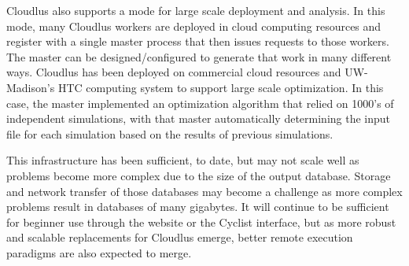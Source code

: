 Cloudlus also supports a mode for large scale deployment and analysis.  In
this mode, many Cloudlus workers are deployed in cloud computing resources and
register with a single master process that then issues requests to those
workers. The master can be designed/configured to generate that work in many
different ways. Cloudlus has been deployed on commercial cloud resources and
UW-Madison's \gls{HTC} computing system to support large scale
optimization.  In this case, the master implemented an
optimization algorithm that relied on 1000's of independent \Cyclus
simulations, with that master automatically determining the input file for
each simulation based on the results of previous simulations.

This infrastructure has been sufficient, to date, but may not scale well as
problems become more complex due to the size of the output database.  Storage
and network transfer of those databases may become a challenge as more complex
problems result in databases of many gigabytes.  It will continue to be
sufficient for beginner use through the website or the Cyclist interface, but
as more robust and scalable replacements for Cloudlus emerge, better remote
execution paradigms are also expected to merge.
